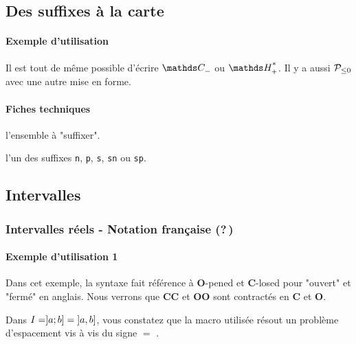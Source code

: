 \documentclass[12pt,a4paper]{article}
\theoremstyle{definition}
\begin{document}
\subsection{Des suffixes à la carte}

\paragraph{Exemple d'utilisation}

\begin{tcblisting}{}
Il est tout de même possible d'écrire $\setspecial{\CC}{n}$ ou $\setspecial{\HH}{sp}$.
Il y a aussi $\setspecial*{\setproba{P}}{n}$ avec une autre mise en forme.
\end{tcblisting}


\paragraph{Fiches techniques}



 l'ensemble à "suffixer".

 l'un des suffixes \verb+n+, \verb+p+, \verb+s+, \verb+sn+ ou \verb+sp+.





\subsection{Intervalles}

\subsubsection{Intervalles réels - Notation française (?\,)}

\paragraph{Exemple d'utilisation 1}

Dans cet exemple, la syntaxe fait référence à \textbf{O}-pened et \textbf{C}-losed pour "ouvert" et "fermé" en anglais.
Nous verrons que \textbf{CC} et \textbf{OO} sont contractés en \textbf{C} et \textbf{O}.

\begin{tcblisting}{}
Dans $I = ]a ; b] = \intervalOC{a}{b}$, vous constatez que la macro utilisée résout
un problème d'espacement vis à vis du signe $=$ .
\end{tcblisting}
\end{document}

